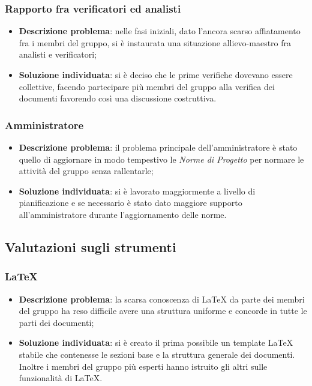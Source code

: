 	\subsubsection{Rapporto fra verificatori ed analisti}
		\begin{itemize}
			\item \textbf{Descrizione problema}: nelle fasi iniziali, dato l'ancora scarso affiatamento fra i membri del gruppo, si è instaurata una situazione allievo-maestro fra analisti e verificatori;
			\item \textbf{Soluzione individuata}: si è deciso che le prime verifiche dovevano essere collettive, facendo partecipare più membri del gruppo alla verifica dei documenti favorendo così una discussione costruttiva.
		\end{itemize}
	\subsubsection{Amministratore}
		\begin{itemize}
			\item \textbf{Descrizione problema}: il problema principale dell'amministratore è stato quello di aggiornare in modo tempestivo le \textit{Norme di Progetto} per normare le attività del gruppo senza rallentarle;
			\item \textbf{Soluzione individuata}: si è lavorato maggiormente a livello di pianificazione e se necessario è stato dato maggiore supporto all'amministratore durante l'aggiornamento delle norme.
		\end{itemize}
\subsection{Valutazioni sugli strumenti}
	\subsubsection{\LaTeX}
		\begin{itemize}
			\item \textbf{Descrizione problema}: la scarsa conoscenza di \LaTeX\xspace da parte dei membri del gruppo ha reso difficile avere una struttura uniforme e concorde in tutte le parti dei documenti;
			\item \textbf{Soluzione individuata}: si è creato il prima possibile un template \LaTeX\xspace stabile che contenesse le sezioni base e la struttura generale dei documenti. Inoltre i membri del gruppo più esperti hanno istruito gli altri sulle funzionalità di \LaTeX.
		\end{itemize}
